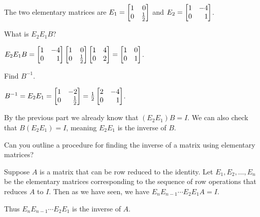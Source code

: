 \documentclass{workbook}
\begin{document}
\begin{slide}
\begin{parts}
\begin{solution}
				The two elementary matrices are $E_1=\mat{1&0\\0&\frac{1}{2}}$
				and $E_2=\mat{1&-4\\0&1}$.
			\end{solution}
		\item What is $E_2E_1B$?
			\begin{solution}
				$E_2E_1B=\mat{1&-4\\0&1}\mat{1&0\\0&\frac{1}{2}}\mat{1 &4\\0 &2}=\mat{1&0\\0&1}$.
			\end{solution}
		\item Find $B^{-1}$.
			\begin{solution}
				$B^{-1}=E_2E_1=\mat{1&-2\\0&\frac{1}{2}}=\frac{1}{2}\mat{2&-4\\0&1}$.

				By the previous part we already know that $(E_2E_1)B=I$. We can also
				check that $B(E_2E_1)=I$, meaning $E_2E_1$ is the inverse of $B$.
			\end{solution}
		\item Can you outline a procedure for finding the inverse of a matrix
		using elementary matrices?
			\begin{solution}
				Suppose $A$ is a matrix that can be row reduced to the identity.
				Let $E_1, E_2, \dots, E_n$ be the elementary matrices corresponding
				to the sequence of row operations that reduces $A$ to $I$. Then
				as we have seen, we have $E_n E_{n-1} \cdots E_2 E_1 A = I$.

				Thus $E_n E_{n-1} \cdots E_2 E_1$ is the inverse of $A$.
			\end{solution}
	\end{parts}
\end{slide}
\end{document}
